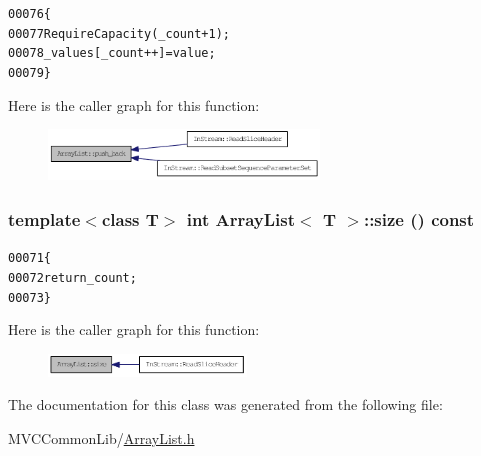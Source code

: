 \begin{footnotesize}\begin{alltt}
00076         \{
00077                 RequireCapacity(\_count + 1);
00078                 \_values[\_count++] = value;
00079         \}
\end{alltt}\end{footnotesize}




Here is the caller graph for this function:\nopagebreak
\begin{figure}[H]
\begin{center}
\leavevmode
\includegraphics[width=204pt]{class_array_list_a7b5376678a9b5af0e0ed913fbe04b902_icgraph}
\end{center}
\end{figure}


\hypertarget{class_array_list_aff9c6ac40886044e4653174950d23e74}{
\subsubsection[{size}]{\setlength{\rightskip}{0pt plus 5cm}template$<$class T$>$ int {\bf ArrayList}$<$ T $>$::size () const}}
\label{class_array_list_aff9c6ac40886044e4653174950d23e74}




\begin{footnotesize}\begin{alltt}
00071         \{
00072                 \textcolor{keywordflow}{return} \_count;
00073         \}
\end{alltt}\end{footnotesize}




Here is the caller graph for this function:\nopagebreak
\begin{figure}[H]
\begin{center}
\leavevmode
\includegraphics[width=149pt]{class_array_list_aff9c6ac40886044e4653174950d23e74_icgraph}
\end{center}
\end{figure}




The documentation for this class was generated from the following file:\begin{DoxyCompactItemize}
\item 
MVCCommonLib/\hyperlink{_array_list_8h}{ArrayList.h}\end{DoxyCompactItemize}
